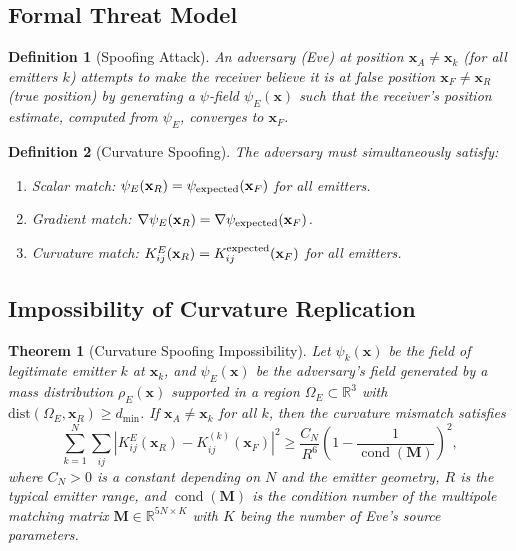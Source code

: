 \documentclass[twocolumn,superscriptaddress,prd,nofootinbib]{revtex4-2}
\newcommand{\xvec}{\mathbf{x}}
\DeclareMathOperator{\cond}{cond}
\newtheorem{theorem}{Theorem}
\newtheorem{definition}{Definition}
\begin{document}
\subsection{Formal Threat Model}

\begin{definition}[Spoofing Attack]
An adversary (Eve) at position $\xvec_A \neq \xvec_k$ (for all
emitters $k$) attempts to make the receiver believe it is at false
position $\xvec_F \neq \xvec_R$ (true position) by generating a
$\psi$-field $\psi_E(\xvec)$ such that the receiver's position
estimate, computed from $\psi_E$, converges to $\xvec_F$.
\end{definition}

\begin{definition}[Curvature Spoofing]
The adversary must simultaneously satisfy:
\begin{enumerate}
\item \emph{Scalar match:} $\psi_E(\xvec_R) = \psi_{\rm expected}(\xvec_F)$
for all emitters.
\item \emph{Gradient match:} $\nabla\psi_E(\xvec_R) = \nabla\psi_{\rm expected}(\xvec_F)$.
\item \emph{Curvature match:}
$K_{ij}^E(\xvec_R) = K_{ij}^{\rm expected}(\xvec_F)$ for all emitters.
\end{enumerate}
\end{definition}

\subsection{Impossibility of Curvature Replication}

\begin{theorem}[Curvature Spoofing Impossibility]\label{thm:spoof}
Let $\psi_k(\xvec)$ be the field of legitimate emitter $k$ at
$\xvec_k$, and $\psi_E(\xvec)$ be the adversary's field generated by a
mass distribution $\rho_E(\xvec)$ supported in a region
$\Omega_E \subset \mathbb{R}^3$ with
$\text{dist}(\Omega_E, \xvec_R) \geq d_{\min}$.
If $\xvec_A \neq \xvec_k$ for all $k$, then the curvature mismatch
satisfies
\begin{equation}
\boxed{
\sum_{k=1}^N\sum_{ij} |K_{ij}^E(\xvec_R) - K_{ij}^{(k)}(\xvec_F)|^2
\geq \frac{C_N}{R^6}\left(1 - \frac{1}{\cond(\mathbf{M})}\right)^2,
}
\label{eq:curv-mismatch}
\end{equation}
where $C_N > 0$ is a constant depending on $N$ and the emitter
geometry, $R$ is the typical emitter range, and $\cond(\mathbf{M})$ is
the condition number of the multipole matching matrix
$\mathbf{M} \in \mathbb{R}^{5N\times K}$ with $K$ being the number of
Eve's source parameters.
\end{theorem}
\end{document}
